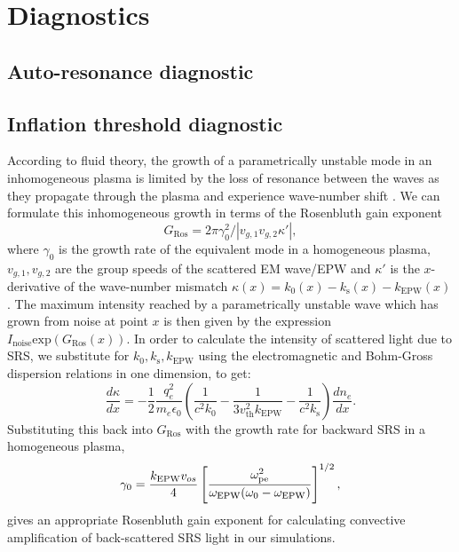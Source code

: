 \section{Diagnostics}

\subsection{Auto-resonance diagnostic}

\subsection{Inflation threshold diagnostic}\label{diag:threshold}
According to fluid theory, the growth of a parametrically unstable mode in an inhomogeneous plasma is limited by the loss of resonance between the waves as they propagate through the plasma and experience wave-number shift \cite{Rosenbluth1972}. We can formulate this inhomogeneous growth in terms of the Rosenbluth gain exponent\cite{Rosenbluth1972}
\begin{equation}\label{eqn:GRos}
    G_\mathrm{Ros} = 2\pi\gamma_0^2/|v_{g,1}v_{g,2}\kappa'|,
\end{equation}
where $\gamma_0$ is the growth rate of the equivalent mode in a homogeneous plasma, $v_{g,1}, v_{g,2}$ are the group speeds of the scattered EM wave/EPW and $\kappa'$ is the $x$-derivative of the wave-number mismatch $\kappa(x) = k_0(x) -k_\mathrm{s}(x) -k_\mathrm{EPW}(x)$. The maximum intensity reached by a parametrically unstable wave which has grown from noise at point $x$ is then given by the expression $I_\mathrm{noise}\mathrm{exp}(G_\mathrm{Ros}(x))$. In order to calculate the intensity of scattered light due to SRS, we substitute for $k_0,k_\mathrm{s},k_\mathrm{EPW}$ using the electromagnetic and Bohm-Gross dispersion relations in one dimension, to get:
\begin{equation}\label{eqn:kappaPrime}
    \frac{d\kappa}{dx}= -\frac{1}{2}\frac{q_e^2}{m_e\epsilon_0}
    \left(\frac{1}{c^2k_0}-\frac{1}{3v_\mathrm{th}^2k_\mathrm{EPW}}-\frac{1}{c^2k_\mathrm{s}}\right)\frac{dn_e}{dx}.
\end{equation}
Substituting this back into $G_\mathrm{Ros}$ with the growth rate for backward SRS in a homogeneous plasma\cite{kruer2003},
\begin{equation}\label{eqn:gamma0}
    \centering
    \gamma_0 = \frac{k_\mathrm{EPW}v_{os}}{4}\left[\frac{\omega_{\mathrm{pe}}^2}{\omega_\mathrm{EPW}(\omega_0-\omega_\mathrm{EPW})}\right]^{1/2},
\end{equation}
gives an appropriate Rosenbluth gain exponent for calculating convective amplification of
back-scattered SRS light in our simulations.



